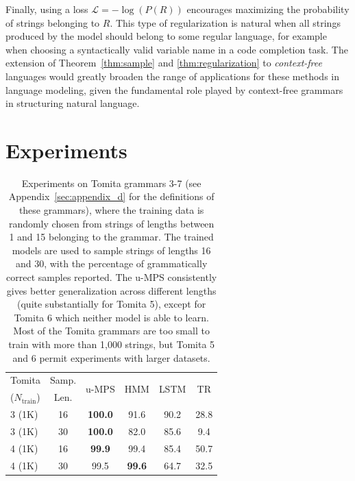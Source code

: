 \documentclass[twoside]{article}
\newcommand{\mc}[1]{\mathcal{#1}}
\begin{document}
Finally, using a loss $\mc{L} = -\log(P(R))$ encourages maximizing the probability of strings belonging to $R$. This type of regularization is natural when all strings produced by the model should belong to some regular language, for example when choosing a syntactically valid variable name in a code completion task. The extension of Theorem~\ref{thm:sample} and \ref{thm:regularization} to \emph{context-free} languages would greatly broaden the range of applications for these methods in language modeling, given the fundamental role played by context-free grammars in structuring natural language.

\section{Experiments}
\label{sec:experiments}
%
\begin{table}[t]
\caption{Experiments on Tomita grammars 3-7 (see Appendix~\ref{sec:appendix_d} for the definitions of these grammars), where the training data is randomly chosen from strings of lengths between 1 and 15 belonging to the grammar. The trained models are used to sample strings of lengths 16 and 30, with the percentage of grammatically correct samples reported. The u-MPS consistently gives better generalization across different lengths (quite substantially for Tomita 5), except for Tomita 6 which neither model is able to learn. Most of the Tomita grammars are too small to train with more than 1,000 strings, but Tomita 5 and 6 permit experiments with larger datasets.}
\label{tab:tomita}
\setlength\aboverulesep{0.1pt}
\setlength\belowrulesep{0.1pt}
\renewcommand{\arraystretch}{1.1}
\begin{center}
\begin{small}
\begin{sc}
\begin{tabular}{lc|cccc}
    Tomita & Samp. & \multirow{2}{*}{u-MPS} & \multirow{2}{*}{HMM} & \multirow{2}{*}{LSTM} & \multirow{2}{*}{TR} \\
    ($N_{\mathrm{train}}$) & Len. &  &  &  \\
    \midrule
    3 (1K)  & 16 & \textbf{100.0} & 91.6          & 90.2          & 28.8 \\
    3 (1K)  & 30 & \textbf{100.0} & 82.0          & 85.6          & 9.4  \\
    4 (1K)  & 16 & \textbf{99.9}  & 99.4          & 85.4          & 50.7 \\
    4 (1K)  & 30 & 99.5           & \textbf{99.6} & 64.7          & 32.5 \\

\end{tabular}
\end{sc}
\end{small}
\end{center}
\end{table}
\end{document}
